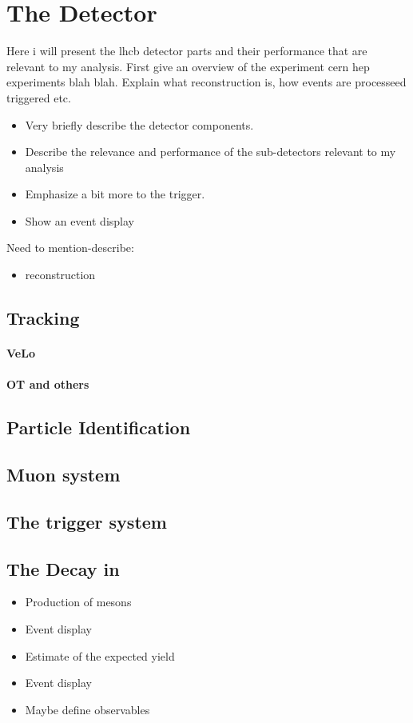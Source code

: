 

\chapter{The \lhcb Detector}
\label{lhcb_detector}

Here i will present the lhcb detector parts and their performance that are relevant to my analysis.
First give an overview of the experiment cern hep experiments blah blah. Explain what reconstruction
is, how events are processeed triggered etc.

\begin{itemize}
  \item Very briefly describe the detector components.
  \item Describe the relevance and performance of the sub-detectors relevant to my analysis
  \item Emphasize a bit more to the trigger.
  \item Show an event display
\end{itemize}

Need to mention-describe:
\begin{itemize}
  \item reconstruction
\end{itemize}



\section{Tracking}
\subsubsection{VeLo}
\subsubsection{OT and others}

\section{Particle Identification}

\section{Muon system}

\section{The trigger system}


\section{The \BJpsiKst Decay in \lhcb}

\begin{itemize}
  \item Production of \Bs mesons
  \item Event display
  \item Estimate of the expected yield
  \item Event display
  \item Maybe define observables
\end{itemize}
